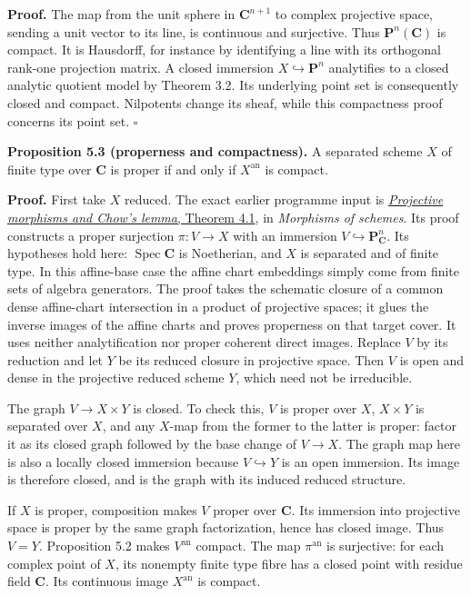 \documentclass[11pt]{article}
\begin{document}
\textbf{Proof.} The map from the unit sphere in \(\mathbf C^{n+1}\) to
complex projective space, sending a unit vector to its line, is
continuous and surjective. Thus \(\mathbf P^n(\mathbf C)\) is compact.
It is Hausdorff, for instance by identifying a line with its orthogonal
rank-one projection matrix. A closed immersion
\(X\hookrightarrow\mathbf P^n\) analytifies to a closed analytic
quotient model by Theorem 3.2. Its underlying point set is consequently
closed and compact. Nilpotents change its sheaf, while this compactness
proof concerns its point set. \(\square\)

\textbf{Proposition 5.3 (properness and compactness).} A separated
scheme \(X\) of finite type over \(\mathbf C\) is proper if and only if
\(X^{\mathrm{an}}\) is compact.

\textbf{Proof.} First take \(X\) reduced. The exact earlier programme
input is
\href{../../AG-GS/prerequisites/AG-MO/projective-morphisms-and-chows-lemma.html}{\emph{Projective
morphisms and Chow's lemma}, Theorem 4.1}, in \emph{Morphisms of
schemes}. Its proof constructs a proper surjection \(\pi:V\to X\) with
an immersion \(V\hookrightarrow\mathbf P^n_{\mathbf C}\). Its hypotheses
hold here: \(\operatorname{Spec}\mathbf C\) is Noetherian, and \(X\) is
separated and of finite type. In this affine-base case the affine chart
embeddings simply come from finite sets of algebra generators. The proof
takes the schematic closure of a common dense affine-chart intersection
in a product of projective spaces; it glues the inverse images of the
affine charts and proves properness on that target cover. It uses
neither analytification nor proper coherent direct images. Replace \(V\)
by its reduction and let \(Y\) be its reduced closure in projective
space. Then \(V\) is open and dense in the projective reduced scheme
\(Y\), which need not be irreducible.

The graph \(V\to X\times Y\) is closed. To check this, \(V\) is proper
over \(X\), \(X\times Y\) is separated over \(X\), and any \(X\)-map
from the former to the latter is proper: factor it as its closed graph
followed by the base change of \(V\to X\). The graph map here is also a
locally closed immersion because \(V\hookrightarrow Y\) is an open
immersion. Its image is therefore closed, and is the graph with its
induced reduced structure.

If \(X\) is proper, composition makes \(V\) proper over \(\mathbf C\).
Its immersion into projective space is proper by the same graph
factorization, hence has closed image. Thus \(V=Y\). Proposition 5.2
makes \(V^{\mathrm{an}}\) compact. The map \(\pi^{\mathrm{an}}\) is
surjective: for each complex point of \(X\), its nonempty finite type
fibre has a closed point with residue field \(\mathbf C\). Its
continuous image \(X^{\mathrm{an}}\) is compact.
\end{document}

